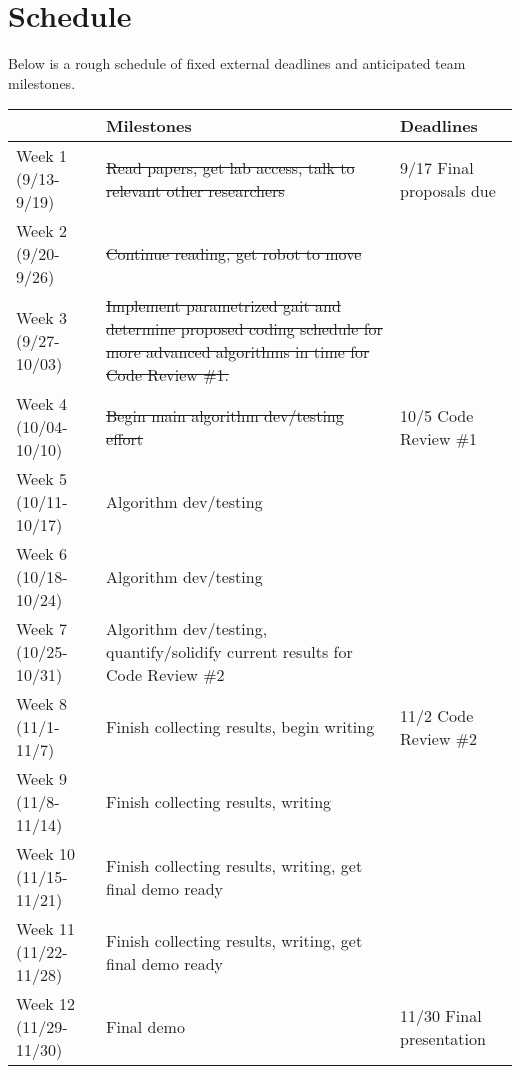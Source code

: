 \section{Schedule}

Below is a rough schedule of fixed external deadlines and anticipated
team milestones.

\newcommand{\done}[1]{{\color{doneColor}\sout{#1}}}

\begin{center}
\begin{tabular}{|l||p{2.5in}|p{1.5in}|}
\hline
                        & {\bf Milestones} & {\bf Deadlines}
\\ \hline

Week 1 (9/13-9/19)    & \done{Read papers, get lab access, talk to relevant other researchers} & 9/17 Final proposals due
\\ \hline

Week 2 (9/20-9/26)    & \done{Continue reading, get robot to move} &
\\ \hline

Week 3 (9/27-10/03)   & \done{Implement parametrized gait and determine proposed coding schedule for more advanced algorithms in time for Code Review \#1.} &
\\ \hline

Week 4 (10/04-10/10)  & \done{Begin main algorithm dev/testing effort} & 10/5 Code Review \#1
\\ \hline

Week 5 (10/11-10/17)  & Algorithm dev/testing &
\\ \hline

Week 6 (10/18-10/24)  & Algorithm dev/testing &
\\ \hline

Week 7 (10/25-10/31)  & Algorithm dev/testing, quantify/solidify current results for Code Review \#2 &
\\ \hline

Week 8 (11/1-11/7)    & Finish collecting results, begin writing & 11/2 Code Review \#2
\\ \hline

Week 9 (11/8-11/14)   & Finish collecting results, writing &
\\ \hline

Week 10 (11/15-11/21) & Finish collecting results, writing, get final demo ready &
\\ \hline

Week 11 (11/22-11/28) & Finish collecting results, writing, get final demo ready  &
\\ \hline

Week 12 (11/29-11/30) & Final demo  & 11/30 Final presentation
\\ \hline
\end{tabular}
\end{center}



